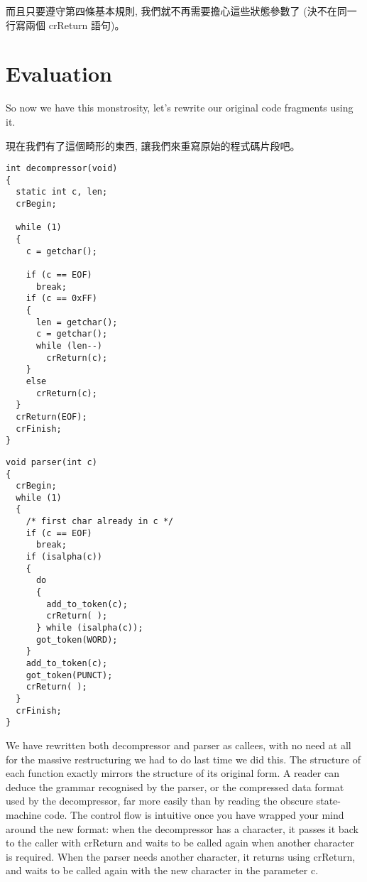 \documentclass[12pt]{article}
\begin{document}
\begin{CJK}{UTF8}{bsmi}
而且只要遵守第四條基本規則, 我們就不再需要擔心這些狀態參數了 (決不在同一行寫兩個 crReturn 語句)。 

\section{Evaluation}

So now we have this monstrosity, let's rewrite our original code fragments using it.

現在我們有了這個畸形的東西, 讓我們來重寫原始的程式碼片段吧。 

\newpage
\begin{multicols}{2}
\begin{lstlisting}[caption=decompressor, basicstyle=\footnotesize, breaklines=true]
int decompressor(void) 
{
  static int c, len;
  crBegin;

  while (1) 
  {
    c = getchar();

    if (c == EOF)
      break;
    if (c == 0xFF) 
    {
      len = getchar();
      c = getchar();
      while (len--)
        crReturn(c);
    } 
    else
      crReturn(c);
  }
  crReturn(EOF);
  crFinish;
}
\end{lstlisting}


\begin{lstlisting}[caption=parser, basicstyle=\footnotesize, breaklines=true]
void parser(int c) 
{
  crBegin;
  while (1) 
  {
    /* first char already in c */
    if (c == EOF)
      break;
    if (isalpha(c)) 
    {
      do 
      {
        add_to_token(c);
        crReturn( );
      } while (isalpha(c));
      got_token(WORD);
    }
    add_to_token(c);
    got_token(PUNCT);
    crReturn( );
  }
  crFinish;
}
\end{lstlisting}
\end{multicols}

We have rewritten both decompressor and parser as callees, with no need at all for the massive restructuring we had to do last time we did this. The structure of each function exactly mirrors the structure of its original form. A reader can deduce the grammar recognised by the parser, or the compressed data format used by the decompressor, far more easily than by reading the obscure state-machine code. The control flow is intuitive once you have wrapped your mind around the new format: when the decompressor has a character, it passes it back to the caller with crReturn and waits to be called again when another character is required. When the parser needs another character, it returns using crReturn, and waits to be called again with the new character in the parameter c.


\end{CJK}
\end{document}

